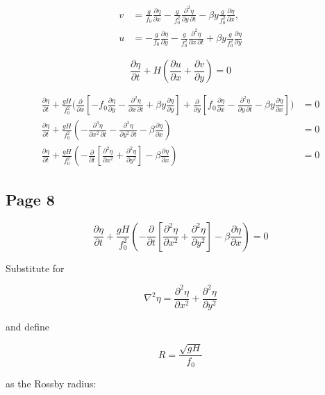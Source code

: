 \documentclass[11pt]{article}
\begin{document}
\begin{align}
v
&=
\frac{g}{f_0}\frac{\partial \eta}{\partial x}
-\frac{g}{f_0^2}\frac{\partial^2 \eta}{\partial y\,\partial t}
-\beta y \frac{g}{f_0^2}\frac{\partial \eta}{\partial x},
\\[6pt]
u
&=
-\frac{g}{f_0}\frac{\partial \eta}{\partial y}
-\frac{g}{f_0^2}\frac{\partial^2 \eta}{\partial x\,\partial t}
+\beta y \frac{g}{f_0^2}\frac{\partial \eta}{\partial y}
\tag{6,7}
\end{align}

\[
\frac{\partial \eta}{\partial t}
+
H\left(
\frac{\partial u}{\partial x}
+\frac{\partial v}{\partial y}
\right)
=
0
\tag{8}
\]

\begin{align*}
\frac{\partial \eta}{\partial t}
+\frac{gH}{f_0^2}
\Biggl(
\frac{\partial}{\partial x}
\left[
-f_0\frac{\partial \eta}{\partial y}
-\frac{\partial^2 \eta}{\partial x\,\partial t}
+\beta y \frac{\partial \eta}{\partial y}
\right]
+
\frac{\partial}{\partial y}
\left[
f_0\frac{\partial \eta}{\partial x}
-\frac{\partial^2 \eta}{\partial y\,\partial t}
-\beta y \frac{\partial \eta}{\partial x}
\right]
\Biggr)
&=0
\\[8pt]
\frac{\partial \eta}{\partial t}
+\frac{gH}{f_0^2}
\left(
-\frac{\partial^3 \eta}{\partial x^2\,\partial t}
-\frac{\partial^3 \eta}{\partial y^2\,\partial t}
-\beta \frac{\partial \eta}{\partial x}
\right)
&=0
\\[8pt]
\frac{\partial \eta}{\partial t}
+\frac{gH}{f_0^2}
\left(
-\frac{\partial}{\partial t}
\left[
\frac{\partial^2 \eta}{\partial x^2}
+\frac{\partial^2 \eta}{\partial y^2}
\right]
-\beta \frac{\partial \eta}{\partial x}
\right)
&=0
\end{align*}

\subsection*{Page 8}
\[
\frac{\partial \eta}{\partial t}
+\frac{gH}{f_0^2}
\left(
-\frac{\partial}{\partial t}
\left[
\frac{\partial^2 \eta}{\partial x^2}
+\frac{\partial^2 \eta}{\partial y^2}
\right]
-\beta \frac{\partial \eta}{\partial x}
\right)
=0
\]

Substitute for

\[
\nabla^2 \eta
=
\frac{\partial^2 \eta}{\partial x^2}
+
\frac{\partial^2 \eta}{\partial y^2}
\]

and define

\[
R=\frac{\sqrt{gH}}{f_0}
\]

as the Rossby radius:
\end{document}
